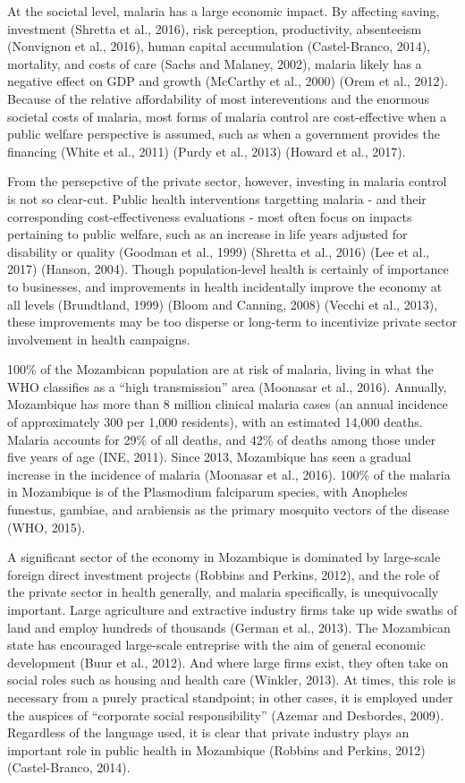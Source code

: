 \documentclass[]{article}
\begin{document}
At the societal level, malaria has a large economic impact. By affecting
saving, investment (Shretta et al., 2016), risk perception,
productivity, absenteeism (Nonvignon et al., 2016), human capital
accumulation (Castel-Branco, 2014), mortality, and costs of care (Sachs
and Malaney, 2002), malaria likely has a negative effect on GDP and
growth (McCarthy et al., 2000) (Orem et al., 2012). Because of the
relative affordability of most intereventions and the enormous societal
costs of malaria, most forms of malaria control are cost-effective when
a public welfare perspective is assumed, such as when a government
provides the financing (White et al., 2011) (Purdy et al., 2013) (Howard
et al., 2017).

From the persepctive of the private sector, however, investing in
malaria control is not so clear-cut. Public health interventions
targetting malaria - and their corresponding cost-effectiveness
evaluations - most often focus on impacts pertaining to public welfare,
such as an increase in life years adjusted for disability or quality
(Goodman et al., 1999) (Shretta et al., 2016) (Lee et al., 2017)
(Hanson, 2004). Though population-level health is certainly of
importance to businesses, and improvements in health incidentally
improve the economy at all levels (Brundtland, 1999) (Bloom and Canning,
2008) (Vecchi et al., 2013), these improvements may be too disperse or
long-term to incentivize private sector involvement in health campaigns.

100\% of the Mozambican population are at risk of malaria, living in
what the WHO classifies as a ``high transmission'' area (Moonasar et
al., 2016). Annually, Mozambique has more than 8 million clinical
malaria cases (an annual incidence of approximately 300 per 1,000
residents), with an estimated 14,000 deaths. Malaria accounts for 29\%
of all deaths, and 42\% of deaths among those under five years of age
(INE, 2011). Since 2013, Mozambique has seen a gradual increase in the
incidence of malaria (Moonasar et al., 2016). 100\% of the malaria in
Mozambique is of the Plasmodium falciparum species, with Anopheles
funestus, gambiae, and arabiensis as the primary mosquito vectors of the
disease (WHO, 2015).

A significant sector of the economy in Mozambique is dominated by
large-scale foreign direct investment projects (Robbins and Perkins,
2012), and the role of the private sector in health generally, and
malaria specifically, is unequivocally important. Large agriculture and
extractive industry firms take up wide swaths of land and employ
hundreds of thousands (German et al., 2013). The Mozambican state has
encouraged large-scale entreprise with the aim of general economic
development (Buur et al., 2012). And where large firms exist, they often
take on social roles such as housing and health care (Winkler, 2013). At
times, this role is necessary from a purely practical standpoint; in
other cases, it is employed under the auspices of ``corporate social
responsibility'' (Azemar and Desbordes, 2009). Regardless of the
language used, it is clear that private industry plays an important role
in public health in Mozambique (Robbins and Perkins, 2012)
(Castel-Branco, 2014).
\end{document}
